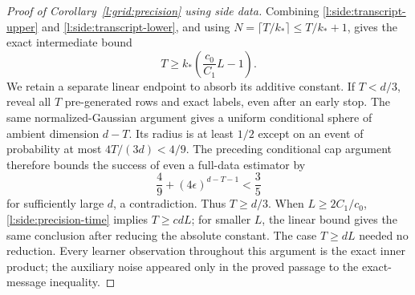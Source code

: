 \begin{proof}[Proof of Corollary~\ref{l:grid:precision} using side data]
Combining \eqref{l:side:transcript-upper} and
\eqref{l:side:transcript-lower}, and using
$N=\lceil T/k_*\rceil\le T/k_*+1$, gives the exact intermediate bound
\begin{equation}\label{l:side:precision-time}
 T\ge k_*\left(\frac{c_0}{C_1}L-1\right).
\end{equation}
We retain a separate linear endpoint to absorb its additive constant.
If $T<d/3$, reveal all $T$ pre-generated rows and exact labels, even after
an early stop.  The same normalized-Gaussian argument gives a uniform
conditional sphere of ambient dimension $d-T$.  Its radius is at least
$1/2$ except on an event of probability at most $4T/(3d)<4/9$.
The preceding conditional cap argument therefore bounds the success of
even a full-data estimator by
\[
 \frac49+(4\epsilon)^{d-T-1}<\frac35
\]
for sufficiently large $d$, a contradiction.  Thus $T\ge d/3$.
When $L\ge2C_1/c_0$, \eqref{l:side:precision-time} implies $T\ge cdL$;
for smaller $L$, the linear bound gives the same conclusion after reducing
the absolute constant.  The case $T\ge dL$ needed no reduction.
Every learner observation throughout this argument is the exact inner
product; the auxiliary noise appeared only in the proved passage to
the exact-message inequality.
\end{proof}
